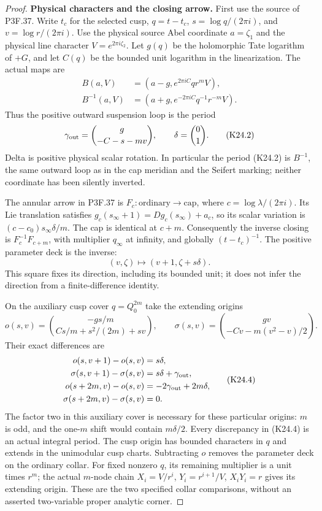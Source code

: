 \begin{proof}
\par\medskip\noindent\textbf{Physical characters and the closing arrow.}
First use the source of P3F.37. Write $t_c$ for the selected cusp,
$q=t-t_c$, $s=\log q/(2\pi i)$, and $v=\log r/(2\pi i)$.
Use the physical source Abel coordinate $a=\zeta_1$ and the
physical line character $V=e^{2\pi i\zeta_2}$. Let $g(q)$
be the holomorphic Tate logarithm of $+G$, and let $C(q)$ be
the bounded unit logarithm in the linearization. The actual maps
are
\[
 \begin{aligned}
 B(a,V)&=(a-g,e^{2\pi iC}qr^mV),\\
 B^{-1}(a,V)&=(a+g,e^{-2\pi iC}q^{-1}r^{-m}V).
 \end{aligned}
\]
Thus the positive outward suspension loop is the period
\[
 \gamma_{\rm out}=\binom{g}{-C-s-mv},\qquad
 \delta=\binom01.                                    \tag{K24.2}
\]
Delta is positive physical scalar rotation. In particular the
period (K24.2) is $B^{-1}$, the same outward loop as in the
cap meridian and the Seifert marking; neither coordinate has
been silently inverted.

The annular arrow in P3F.37 is
$F_c:\text{ordinary}\to\text{cap}$, where
$c=\log\lambda/(2\pi i)$. Its Lie translation satisfies
$g_c(s_\infty+1)=Dg_c(s_\infty)+a_c$, so its scalar variation
is $(c-c_0)s_\infty\delta/m$. The cap is identical at $c+m$.
Consequently the inverse closing is $F_c^{-1}F_{c+m}$, with
multiplier $q_\infty$ at infinity, and globally
$(t-t_c)^{-1}$. The positive parameter deck is the inverse:
\[
              (v,\zeta)\longmapsto(v+1,\zeta+s\delta). \tag{K24.3}
\]
This square fixes its direction, including its bounded unit;
it does not infer the direction from a finite-difference identity.

On the auxiliary cusp cover $q=Q_0^{2m}$ take the extending origins
\[
 o(s,v)=\binom{-gs/m}{Cs/m+s^2/(2m)+sv},\qquad
 \sigma(s,v)=\binom{gv}{-Cv-m(v^2-v)/2}.
\]
Their exact differences are
\[
 \begin{aligned}
 o(s,v+1)-o(s,v)&=s\delta,\\
 \sigma(s,v+1)-\sigma(s,v)&=s\delta+\gamma_{\rm out},\\
 o(s+2m,v)-o(s,v)&=-2\gamma_{\rm out}+2m\delta,\\
 \sigma(s+2m,v)-\sigma(s,v)&=0.
 \end{aligned}                                                    \tag{K24.4}
\]
The factor two in this auxiliary cover is necessary for these
particular origins: $m$ is odd, and the one-$m$ shift would
contain $m\delta/2$. Every discrepancy in (K24.4) is an actual
integral period. The cusp origin has bounded characters in $q$
and extends in the unimodular cusp charts. Subtracting $o$
removes the parameter deck on the ordinary collar. For fixed
nonzero $q$, its remaining multiplier is a unit times $r^m$;
the actual $m$-node chain
$X_i=V/r^i$, $Y_i=r^{i+1}/V$, $X_iY_i=r$ gives its extending
origin. These are the two specified collar comparisons, without
an asserted two-variable proper analytic corner.


\end{proof}
